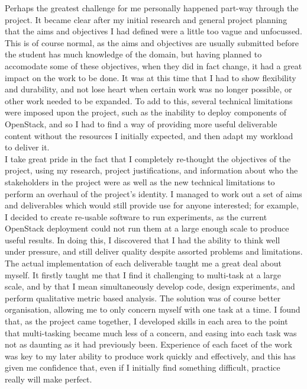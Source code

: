 Perhaps the greatest challenge for me personally happened part-way through the project. It became clear after my initial research and general project planning that the aims and objectives I had defined were a little too vague and unfocussed. This is of course normal, as the aims and objectives are usually submitted before the student has much knowledge of the domain, but having planned to accomodate some of these objectives, when they did in fact change, it had a great impact on the work to be done. It was at this time that I had to show flexibility and durability, and not lose heart when certain work was no longer possible, or other work needed to be expanded. 
To add to this, several technical limitations were imposed upon the project, such as the inability to deploy components of OpenStack, and so I had to find a way of providing more useful deliverable content without the resources I initially expected, and then adapt my workload to deliver it.\\
I take great pride in the fact that I completely re-thought the objectives of the project, using my research, project justifications, and information about who the stakeholders in the project were as well as the new technical limitations to perform an overhaul of the project's identity. I managed to work out a set of aims and deliverables which would still provide use for anyone interested; for example, I decided to create re-usable software to run experiments, as the current OpenStack deployment could not run them at a large enough scale to produce useful results. In doing this, I discovered that I had the ability to think well under pressure, and still deliver quality despite assorted problems and limitations. \\

The actual implementation of each deliverable taught me a great deal about myself. It firstly taught me that I find it challenging to multi-task at a large scale, and by that I mean simultaneously develop code, design experiments, and perform qualitative metric based analysis. The solution was of course better organisation, allowing me to only concern myself with one task at a time. I found that, as the project came together, I developed skills in each area to the point that multi-tasking became much less of a concern, and easing into each task was not as daunting as it had previously been. Experience of each facet of the work was key to my later ability to produce work quickly and effectively, and this has given me confidence that, even if I initially find something difficult, practice really will make perfect. 

